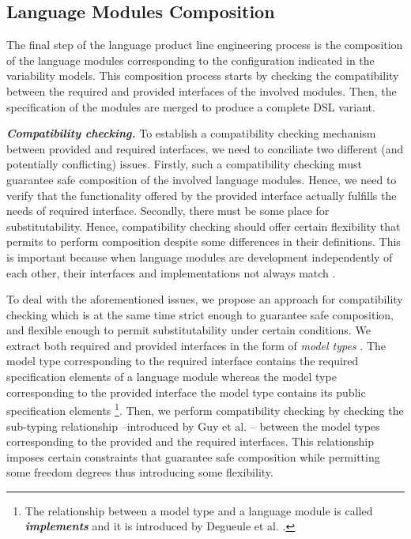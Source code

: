 \subsection{Language Modules Composition}

The final step of the language product line engineering process is the composition of the language modules corresponding to the configuration indicated in the variability models. This composition process starts by checking the compatibility between the required and provided interfaces of the involved modules. Then, the specification of the modules are merged to produce a complete DSL variant.  

\vspace{2mm}
\textbf{\textit{Compatibility checking.}} To establish a compatibility checking mechanism between provided and required interfaces, we need to conciliate two different (and potentially conflicting) issues. Firstly, such a compatibility checking must guarantee safe composition of the involved language modules. Hence, we need to verify that the functionality offered by the provided interface actually fulfills the needs of required interface. Secondly, there must be some place for substitutability. Hence, compatibility checking should offer certain flexibility that permits to perform composition despite some differences in their definitions. This is important because when language modules are development independently of each other, their interfaces and implementations not always match \cite{Gschwind:2012}.

To deal with the aforementioned issues, we propose an approach for compatibility checking which is at the same time strict enough to guarantee safe composition, and flexible enough to permit substitutability under certain conditions. We extract both required and provided interfaces in the form of \textit{model types} \cite{Steel:2007}. The model type corresponding to the required interface contains the required specification elements of a language module whereas the model type corresponding to the provided interface the model type contains its public specification elements \footnote{The relationship between a model type and a language module is called \textsl{\textbf{implements}} and it is introduced by Degueule et al. \cite{Degueule:2015a}.}. Then, we perform compatibility checking by checking the sub-typing relationship --introduced by Guy et al. \cite{Guy:2012}-- between the model types corresponding to the provided and the required interfaces. This relationship imposes certain constraints that guarantee safe composition while permitting some freedom degrees thus introducing some flexibility. %

